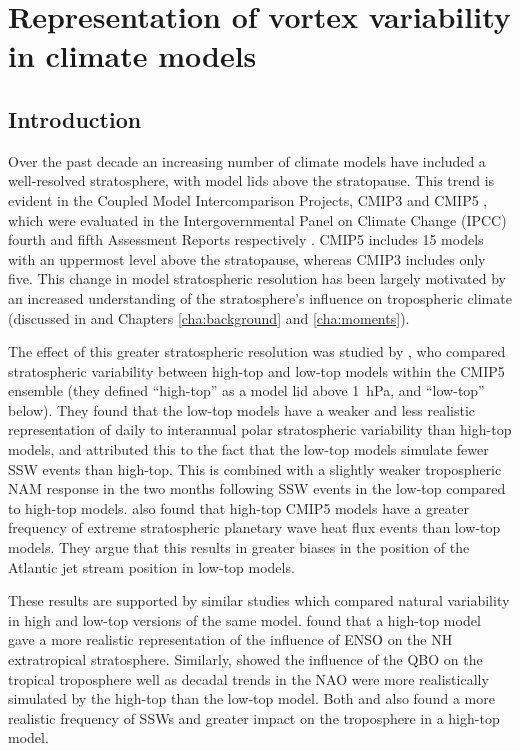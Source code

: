 \chapter{Representation of vortex variability in climate models}
\label{cha:models}


\section{Introduction}
\label{sec:models_introduction}

Over the past decade an increasing number of climate models have included a
well-resolved stratosphere, with model lids above the stratopause. This trend is
evident in the Coupled Model Intercomparison Projects, CMIP3 and CMIP5
\citep{Cordero2006, Taylor2012}, which were evaluated in the Intergovernmental
Panel on Climate Change (IPCC) fourth and fifth Assessment Reports respectively
\citep{Solomon2007, Stocker2013}. CMIP5 includes 15 models with an uppermost
level above the stratopause, whereas CMIP3 includes only five. This change in
model stratospheric resolution has been largely motivated by an increased
understanding of the stratosphere's influence on tropospheric climate (discussed
in \citet{Gerber2012} and Chapters \ref{cha:background} and \ref{cha:moments}).

The effect of this greater stratospheric resolution was studied by
\citet{Charlton-Perez2013}, who compared stratospheric variability between
high-top and low-top models within the CMIP5 ensemble (they defined ``high-top''
as a model lid above 1~hPa, and ``low-top'' below). They found that the low-top
models have a weaker and less realistic representation of daily to interannual
polar stratospheric variability than high-top models, and attributed this to the
fact that the low-top models simulate fewer SSW events than high-top. This is
combined with a slightly weaker tropospheric NAM response in the two months
following SSW events in the low-top compared to high-top
models. \citet{Shaw2014} also found that high-top CMIP5 models have a greater
frequency of extreme stratospheric planetary wave heat flux events than low-top
models. They argue that this results in greater biases in the position of the
Atlantic jet stream position in low-top models.

These results are supported by similar studies which compared natural
variability in high and low-top versions of the same model. \citet{Cagnazzo2009}
found that a high-top model gave a more realistic representation of the
influence of ENSO on the NH extratropical stratosphere. Similarly,
\citet{Hardiman2012a} showed the influence of the QBO on the tropical
troposphere well as decadal trends in the NAO were more realistically simulated
by the high-top than the low-top model. Both \citet{Sassi2010} and
\citet{Hardiman2012a} also found a more realistic frequency of SSWs and greater
impact on the troposphere in a high-top model.

